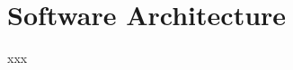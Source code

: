 \documentclass[main.tex]{subfiles}
\begin{document}
\section{Software Architecture}\label{sec:software_architecture}
xxx
\end{document}
